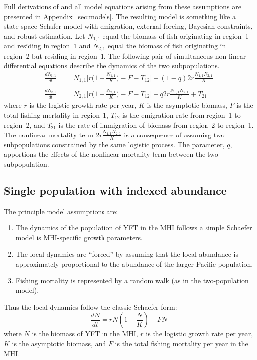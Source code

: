 \documentclass[12pt,letterpaper,twoside]{article}
\newcommand\None{{N_{1,1}}}
\newcommand\Ntwo{{N_{2,1}}}
\begin{document}
Full derivations of and all model equations arising from these
assumptions are presented in Appendix~\ref{sec:models}. The resulting
model is something like a state-space Schafer model with emigration,
external forcing, Bayesian constraints, and robust estimation.
Let $\None$ equal the biomass of fish originating in region~1
and residing in region~1
and $\Ntwo$ equal the biomass of fish originating in region~2
but residing in region~1.
The following pair of simultaneous non-linear differential equations
describe the dynamics of the two subpopulations.
\begin{eqnarray}
\label{eqn:coupledschaeferq}
\frac{d\None}{dt}&=&\None\Big[r\Big(1-\frac{\None}{K}\Big)
-F - T_{12}\Big] - (1-q)2r\frac{\None\Ntwo}{K}\nonumber\\
\\
\frac{d\Ntwo}{dt}&=&\Ntwo\Big[r\Big(1-\frac{\Ntwo}{K}\Big)
-F - T_{12}\Big] - q2r\frac{\None\Ntwo}{K} + T_{21}\nonumber
\end{eqnarray}
where $r$ is the logistic growth rate per year,
$K$ is the asymptotic biomass,
$F$ is the total fishing mortality in region~1, $T_{12}$
is the emigration rate from region~1 to region~2, and $T_{21}$
is the rate of immigration of biomass from region~2 to region~1.
The nonlinear mortality term $2r\frac{\None\Ntwo}{K}$ is a
consequence of assuming
two subpopulations constrained by the same logistic process.
The parameter, $q$, apportions the effects of the nonlinear
mortality term between the two subpopulation.

\subsection{Single population with indexed abundance}
The principle model assumptions are:
\begin{enumerate}
\item The dynamics of the population of YFT in the MHI follows a
simple Schaefer model is MHI-specific growth parameters.
\item The local dynamics are ``forced'' by assuming that the local
abundance is approximately proportional to the abundance of the larger
Pacific population.
\item Fishing mortality is represented by a random walk (as in the
two-population model).
\end{enumerate}

Thus the local dynamics follow the classic Schaefer form:
\begin{equation}
\label{eqn:ischaefer}
\frac{dN}{dt} = rN(1-\frac{N}{K}) - FN
\end{equation}
where $N$ is the biomass of YFT in the MHI, 
$r$ is the logistic growth rate per year,
$K$ is the asymptotic biomass, and
$F$ is the total fishing mortality per year in the MHI.
\end{document}
